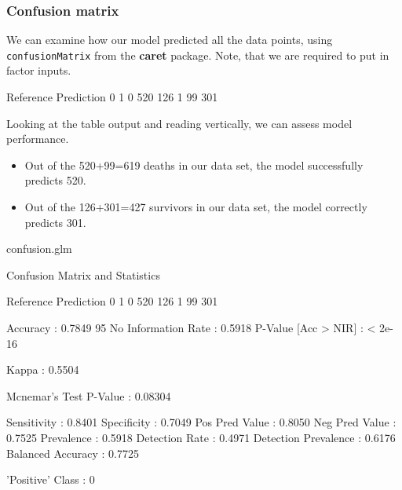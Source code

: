 \documentclass[a4paper]{article}\usepackage[]{graphicx}\usepackage[]{xcolor}
\begin{document}
\subsubsection{Confusion matrix}
We can examine how our model predicted all the data points, using \lstinline|confusionMatrix| from the \textbf{caret} package. Note, that we are required to put in factor inputs.
\begin{Schunk}
\begin{Soutput}
          Reference
Prediction   0   1
         0 520 126
         1  99 301
\end{Soutput}
\end{Schunk}
Looking at the table output and reading vertically, we can assess model performance.
\begin{itemize}
	\item Out of the 520+99=619 deaths in our data set, the model successfully predicts 520.
	\item Out of the 126+301=427 survivors in our data set, the model correctly predicts 301.
\end{itemize}
\begin{Schunk}
\begin{Sinput}
confusion.glm
\end{Sinput}
\begin{Soutput}
Confusion Matrix and Statistics

          Reference
Prediction   0   1
         0 520 126
         1  99 301
                                          
               Accuracy : 0.7849          
                 95%
    No Information Rate : 0.5918          
    P-Value [Acc > NIR] : < 2e-16         
                                          
                  Kappa : 0.5504          
                                          
 Mcnemar's Test P-Value : 0.08304         
                                          
            Sensitivity : 0.8401          
            Specificity : 0.7049          
         Pos Pred Value : 0.8050          
         Neg Pred Value : 0.7525          
             Prevalence : 0.5918          
         Detection Rate : 0.4971          
   Detection Prevalence : 0.6176          
      Balanced Accuracy : 0.7725          
                                          
       'Positive' Class : 0               
                                          
\end{Soutput}
\end{Schunk}
\end{document}
